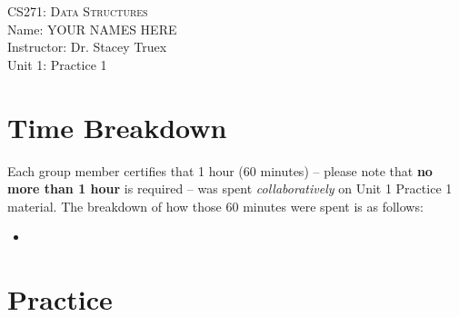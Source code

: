 \documentclass[11pt]{article}
\begin{document}
\begin{center}
{\Large \textsc{CS271: Data Structures}}\vspace{\baselineskip}\\

Name: YOUR NAMES HERE\vspace{\baselineskip}\\
Instructor: Dr. Stacey Truex
\vspace{\baselineskip}\\
\Large{Unit 1: Practice 1}
\end{center}

\section*{Time Breakdown}

Each group member certifies that 1 hour (60 minutes) -- please note that \textbf{no more than 1 hour} is required -- was spent \textit{collaboratively} on Unit 1 Practice 1 material. The breakdown of how those 60 minutes were spent is as follows:
\begin{itemize}
    \item 
\end{itemize}

\section*{Practice}
\end{document}
